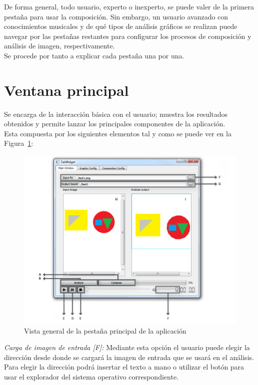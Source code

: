 		De forma general, todo usuario, experto o inexperto, se puede valer de la primera pestaña para usar la composición. Sin embargo, un usuario avanzado con conocimientos musicales y de qué tipos de análisis gráficos se realizan puede navegar por las pestañas restantes para configurar los procesos de composición y análisis de imagen, respectivamente.\\
		
		Se procede por tanto a explicar cada pestaña una por una.

	\section{Ventana principal}
		
		\color{blue}Se encarga de la interacción básica con el usuario; muestra los resultados obtenidos y permite lanzar los principales componentes de la aplicación. 
		\\Esta compuesta por los siguientes elementos tal y como se puede ver en la Figura~\ref{fig:interfaz}:\\\color{black}
		
		
		\begin{figure}[htbp]
		\centering
		\hspace*{-0.9in}
		\includegraphics[scale=0.57]{graphics/interfaz.png}
		\caption{Vista general de la pestaña principal de la aplicación}
		\label{fig:interfaz}
		\end{figure}
		
		\color{blue}\noindent\textit{Carga de imagen de entrada [F]:}  \color{black}Mediante esta opción el usuario puede elegir la dirección desde donde se cargará la imagen de entrada que se usará en el análisis. Para elegir la dirección podrá insertar el texto a mano o utilizar el botón para usar el explorador del sistema operativo correspondiente.\\
		
